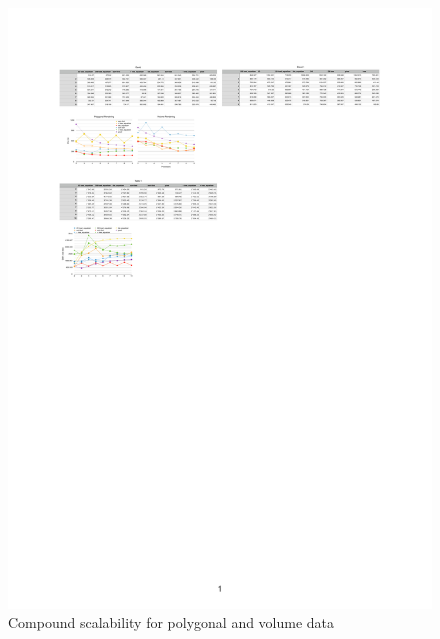 \documentclass[10pt,journal,compsoc]{IEEEtran}
\begin{document}
\begin{figure}[ht]\center
  \includegraphics[width=\textwidth]{images/compounds}
  \caption{\label{fCompounds}Compound scalability for polygonal and volume data}
\end{figure}
\end{document}

